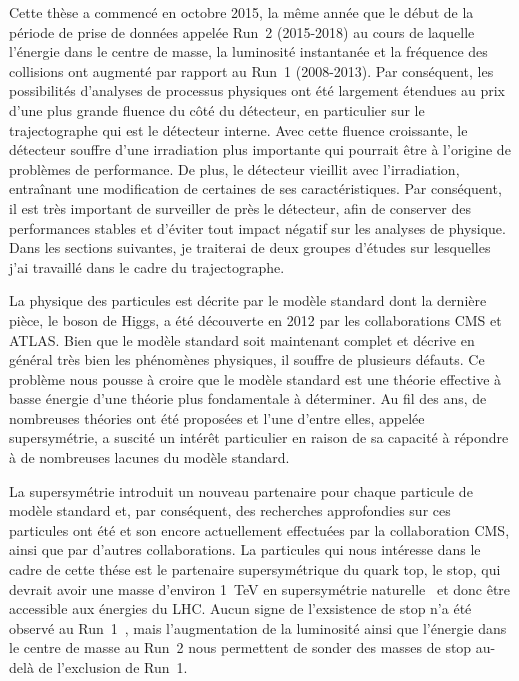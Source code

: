
Cette thèse a commencé en octobre 2015, la même année que le début de la période de prise de données appelée Run~2 (2015-2018) au cours de laquelle l’énergie dans le centre de masse, la luminosité instantanée et la fréquence des collisions ont augmenté par rapport au Run~1 (2008-2013). Par conséquent, les possibilités d'analyses de processus physiques ont été largement étendues au prix d'une plus grande fluence du côté du détecteur, en particulier sur le trajectographe qui est le détecteur interne. Avec cette fluence croissante, le détecteur souffre d’une irradiation plus importante qui pourrait être à l’origine de problèmes de performance. De plus, le détecteur vieillit avec l'irradiation, entraînant une modification de certaines de ses caractéristiques. Par conséquent, il est très important de surveiller de près le détecteur, afin de conserver des performances stables et d'éviter tout impact négatif sur les analyses de physique. Dans les sections suivantes, je traiterai de deux groupes d’études sur lesquelles j’ai travaillé dans le cadre du trajectographe.

La physique des particules est décrite par le modèle standard dont la dernière pièce, le boson de Higgs, a été découverte en 2012 par les collaborations CMS et ATLAS. Bien que le modèle standard soit maintenant complet et décrive en général très bien les phénomènes physiques, il souffre de plusieurs défauts. Ce problème nous pousse à croire que le modèle standard est une théorie effective à basse énergie d’une théorie plus fondamentale à déterminer. Au fil des ans, de nombreuses théories ont été proposées et l'une d'entre elles, appelée supersymétrie, a suscité un intérêt particulier en raison de sa capacité à répondre à de nombreuses lacunes du modèle standard.

La supersymétrie introduit un nouveau partenaire pour chaque particule de modèle standard et, par conséquent, des recherches approfondies sur ces particules ont été et son encore actuellement effectuées par la collaboration CMS, ainsi que par d’autres collaborations. La particules qui nous intéresse dans le cadre de cette thése est le partenaire supersymétrique du quark top, le stop, qui devrait avoir une masse d'environ 1~TeV en supersymétrie naturelle~\cite{Martin:1997ns, Barbieri:1987fn, Papucci:2011wy} et donc être accessible aux énergies du LHC. Aucun signe de l'exsistence de stop n'a été observé au Run~1~\cite{website:SUSYresRunI}, mais l'augmentation de la luminosité ainsi que l'énergie dans le centre de masse au Run~2 nous permettent de sonder des masses de stop au-delà de l'exclusion de Run~1.

